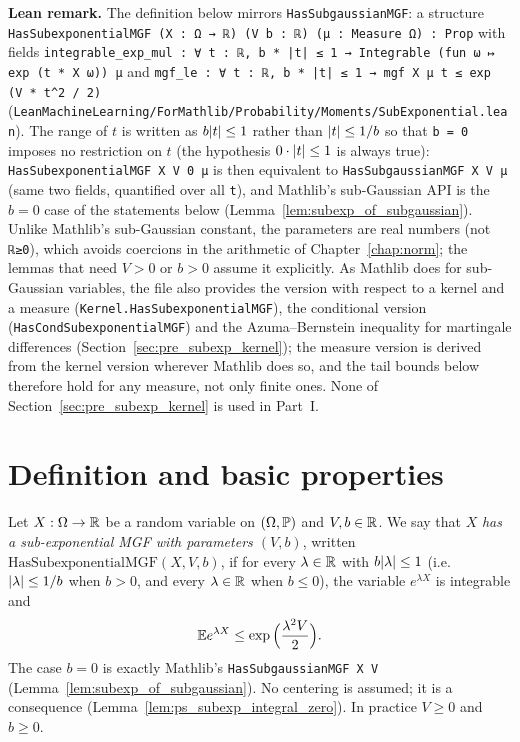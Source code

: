 \textbf{Lean remark.} The definition below mirrors \texttt{HasSubgaussianMGF}: a structure
\texttt{HasSubexponentialMGF (X : Ω → ℝ) (V b : ℝ) (μ : Measure Ω) : Prop} with fields
\texttt{integrable\_exp\_mul : ∀ t : ℝ, b * |t| ≤ 1 → Integrable (fun ω ↦ exp (t * X ω)) μ} and
\texttt{mgf\_le : ∀ t : ℝ, b * |t| ≤ 1 → mgf X μ t ≤ exp (V * t\^{}2 / 2)}
(\texttt{LeanMachineLearning/ForMathlib/Probability/Moments/SubExponential.lean}). The range of $t$ is
written as $b\lvert t \rvert\le1$ rather than $\lvert t \rvert\le1/b$ so that \texttt{b = 0} imposes no
restriction on $t$ (the hypothesis $0\cdot\lvert t \rvert\le1$ is always true):
\texttt{HasSubexponentialMGF X V 0 μ} is then equivalent to \texttt{HasSubgaussianMGF X V μ}
(same two fields, quantified over all \texttt{t}), and Mathlib's sub-Gaussian API is the
$b = 0$ case of the statements below (Lemma~\ref{lem:subexp_of_subgaussian}). Unlike
Mathlib's sub-Gaussian constant, the parameters are real numbers (not \texttt{ℝ≥0}), which
avoids coercions in the arithmetic of Chapter~\ref{chap:norm}; the lemmas that need $V > 0$
or $b > 0$ assume it explicitly. As Mathlib does for sub-Gaussian variables, the file also
provides the version with respect to a kernel and a measure
(\texttt{Kernel.HasSubexponentialMGF}), the conditional version
(\texttt{HasCondSubexponentialMGF}) and the Azuma--Bernstein inequality for martingale
differences (Section~\ref{sec:pre_subexp_kernel}); the measure version is derived from the
kernel version wherever Mathlib does so, and the tail bounds below therefore hold for any
measure, not only finite ones. None of Section~\ref{sec:pre_subexp_kernel} is used in Part~I.

\section{Definition and basic properties}
\label{sec:pre_subexp_def}

\begin{definition}\label{def:subexp}
\leanok
Let $X : \Omega \to \mathbb{R}$ be a random variable on $(\Omega,\mathbb{P})$ and $V, b \in \mathbb{R}$. We say
that $X$ \emph{has a sub-exponential MGF with parameters $(V,b)$}, written
$\mathrm{HasSubexponentialMGF}(X, V, b)$, if for every $\lambda \in \mathbb{R}$ with
$b\lvert \lambda \rvert \le 1$ (i.e.\ $\lvert \lambda \rvert\le1/b$ when $b>0$, and every $\lambda\in\mathbb{R}$ when
$b \le 0$), the variable $e^{\lambda X}$ is integrable and
\[
  \mathbb{E} e^{\lambda X} \le \exp\Big(\frac{\lambda^2V}{2}\Big).
\]
The case $b = 0$ is exactly Mathlib's \texttt{HasSubgaussianMGF X V}
(Lemma~\ref{lem:subexp_of_subgaussian}). No centering is assumed; it is a consequence
(Lemma~\ref{lem:ps_subexp_integral_zero}). In practice $V \ge 0$ and $b \ge 0$.
\end{definition}

